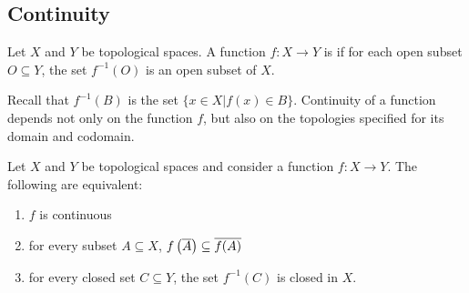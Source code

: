 \subsection{Continuity}

\begin{definition}
Let $X$ and $Y$ be topological spaces.
A function $f \colon X \rightarrow Y$ is  if for each open subset $O \subseteq Y$, the set $f^{-1} (O)$ is an open subset of $X$.
\end{definition}

Recall that $f^{-1}(B)$ is the set $\{ x \in X | f(x) \in B \}$.
Continuity of a function depends not only on the function $f$, but also on the topologies specified for its domain and codomain.

\begin{theorem} \label{theorem:ContinuityEquivalentConditions}
Let $X$ and $Y$ be topological spaces and consider a function $f \colon X \rightarrow Y$.
The following are equivalent:
\begin{enumerate}
\item $f$ is continuous
\item for every subset $A \subseteq X$, $f \left( \overline{A} \right) \subseteq \overline{ f(A) }$
\item for every closed set $C \subseteq Y$, the set $f^{-1} (C)$ is closed in $X$.
\end{enumerate}
\end{theorem}
